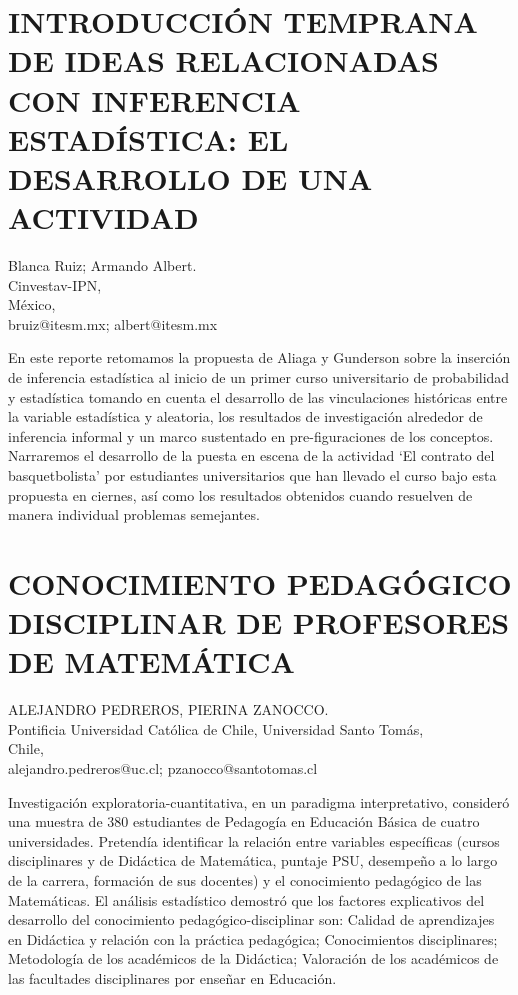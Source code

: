 \section{INTRODUCCIÓN TEMPRANA DE IDEAS RELACIONADAS CON INFERENCIA ESTADÍSTICA:
EL DESARROLLO DE UNA ACTIVIDAD}

\begin{datos}
Blanca Ruiz; Armando Albert. \\
Cinvestav-IPN, \\
\hfill México, \\
 \hfill  bruiz@itesm.mx; albert@itesm.mx
\end{datos}

En este reporte retomamos la propuesta de Aliaga y Gunderson sobre
la inserción de inferencia estadística al inicio de un primer curso
universitario de probabilidad y estadística tomando en cuenta el desarrollo
de las vinculaciones históricas entre la variable estadística y aleatoria,
los resultados de investigación alrededor de inferencia informal y
un marco sustentado en pre-figuraciones de los conceptos. Narraremos
el desarrollo de la puesta en escena de la actividad ‘El contrato
del basquetbolista’ por estudiantes universitarios que han llevado
el curso bajo esta propuesta en ciernes, así como los resultados obtenidos
cuando resuelven de manera individual problemas semejantes.


\section{CONOCIMIENTO PEDAGÓGICO DISCIPLINAR DE PROFESORES DE MATEMÁTICA }

\begin{datos}
ALEJANDRO PEDREROS, PIERINA ZANOCCO. \\
Pontificia Universidad Católica de Chile, Universidad Santo Tomás, \\
\hfill Chile, \\
 \hfill  alejandro.pedreros@uc.cl; pzanocco@santotomas.cl
\end{datos}

Investigación exploratoria-cuantitativa, en un paradigma interpretativo,
consideró una muestra de 380 estudiantes de Pedagogía en Educación
Básica de cuatro universidades. Pretendía identificar la relación
entre variables específicas (cursos disciplinares y de Didáctica de
Matemática, puntaje PSU, desempeño a lo largo de la carrera, formación
de sus docentes) y el conocimiento pedagógico de las Matemáticas.
El análisis estadístico demostró que los factores explicativos del
desarrollo del conocimiento pedagógico-disciplinar son: Calidad de
aprendizajes en Didáctica y relación con la práctica pedagógica; Conocimientos
disciplinares; Metodología de los académicos de la Didáctica; Valoración
de los académicos de las facultades disciplinares por enseñar en Educación. 


